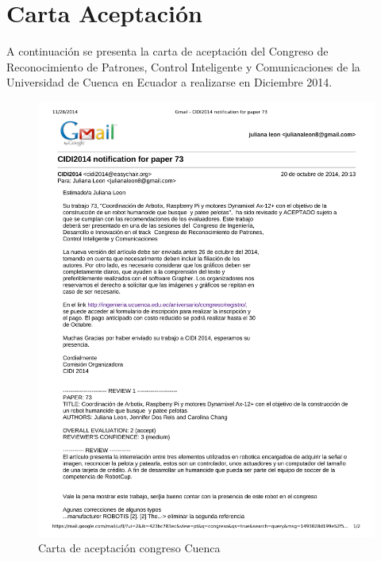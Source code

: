 \chapter{Carta Aceptaci\'on} \label{chapter:carta}
A continuación se presenta la carta de aceptaci\'on del Congreso de Reconocimiento de Patrones, Control Inteligente y Comunicaciones de la Universidad de Cuenca en Ecuador a realizarse en Diciembre 2014.
\begin{figure}[htp] 
\centering
\includegraphics[scale=1]{imagenes/carta.pdf} 
%
\caption{Carta de aceptaci\'on congreso Cuenca}
\end{figure}  
